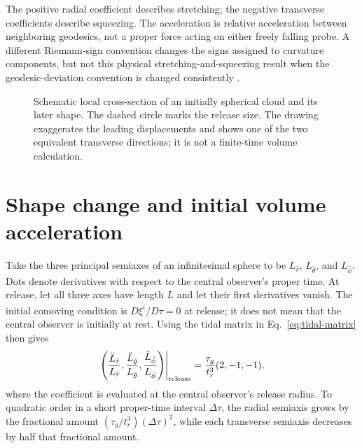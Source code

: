 \documentclass[12pt]{article}
\begin{document}
The positive radial coefficient describes stretching; the negative transverse coefficients describe squeezing. The acceleration is relative acceleration between neighboring geodesics, not a proper force acting on either freely falling probe. A different Riemann-sign convention changes the signs assigned to curvature components, but not this physical stretching-and-squeezing result when the geodesic-deviation convention is changed consistently \cite{HamiltonGR}.

\begin{figure}[tb]
  \centering
  \caption{Schematic local cross-section of an initially spherical cloud and its later shape. The dashed circle marks the release size. The drawing exaggerates the leading displacements and shows one of the two equivalent transverse directions; it is not a finite-time volume calculation.}
  \label{fig:tidal-shape}
\end{figure}

\section{Shape change and initial volume acceleration}
\label{sec:volume}

Take the three principal semiaxes of an infinitesimal sphere to be $L_{\hat r}$, $L_{\hat\theta}$, and $L_{\hat\phi}$. Dots denote derivatives with respect to the central observer’s proper time. At release, let all three axes have length $L$ and let their first derivatives vanish. The initial comoving condition is $D\xi^{\hat i}/D\tau=0$ at release; it does not mean that the central observer is initially at rest. Using the tidal matrix in Eq.~\eqref{eq:tidal-matrix} then gives
\begin{equation}
  \left.
  \left(
    \frac{\ddot L_{\hat r}}{L_{\hat r}},
    \frac{\ddot L_{\hat\theta}}{L_{\hat\theta}},
    \frac{\ddot L_{\hat\phi}}{L_{\hat\phi}}
  \right)
  \right|_{\rm release}
  =\frac{\tau_g}{t_r^3}(2,-1,-1),
  \label{eq:axis-accelerations}
\end{equation}
where the coefficient is evaluated at the central observer's release radius. To quadratic order in a short proper-time interval $\Delta\tau$, the radial semiaxis grows by the fractional amount $(\tau_g/t_r^3)(\Delta\tau)^2$, while each transverse semiaxis decreases by half that fractional amount.
\end{document}
